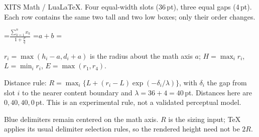 \documentclass{article}
\begin{document}
\par\smallskip
\noindent XITS Math / LuaLaTeX. Four equal-width slots (36\,pt), three equal gaps (4\,pt).
Each row contains the same two tall and two low boxes; only their order changes.\par\medskip
\setbox\highbox=\hbox{$\displaystyle\frac{\displaystyle\sum_{k=1}^{n}x_k}{1+\frac pq}$}
\setbox\lowbox=\hbox{$\displaystyle a+b$}
\mathaxis=\Umathaxis\displaystyle
{}
\par\medskip\small
\noindent $r_i=\max(h_i-a,d_i+a)$ is the radius about the math axis $a$;
$H=\max_i r_i$, $L=\min_i r_i$, $E=\max(r_1,r_4)$.\par
\noindent Distance rule: $R=\max_i\{L+(r_i-L)\exp(-\delta_i/\lambda)\}$,
with $\delta_i$ the gap from slot $i$ to the nearer content boundary and
$\lambda=36+4=40$\,pt. Distances here are $0,40,40,0$\,pt.
This is an experimental rule, not a validated perceptual model.\par
\noindent Blue delimiters remain centered on the math axis. $R$ is the sizing input;
TeX applies its usual delimiter selection rules, so the rendered height need not be $2R$.
\end{document}
